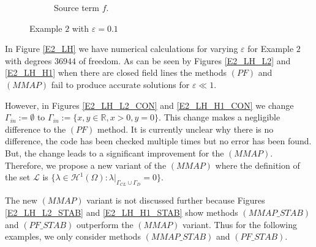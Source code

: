 \documentclass[12pt]{ociamthesis}
\begin{document}
\begin{figure}[H]
\begin{subfigure}{0.5\textwidth}
     \caption{Source term $f$.}
 \end{subfigure}
 \caption{Example $2$ with $\varepsilon = 0.1$} \label{E2_uf}
\end{figure}

In Figure \ref{E2_LH} we have numerical calculations for varying $\varepsilon$ for Example $2$ with degrees $36944$ of freedom. As can be seen by Figures \ref{E2_LH_L2} and \ref{E2_LH_H1} when there are closed field lines the methods $(PF)$ and $(MMAP)$ fail to produce accurate solutions for $\varepsilon \ll 1$.

However, in Figures \ref{E2_LH_L2_CON} and \ref{E2_LH_H1_CON} we change $\Gamma_{in} := \emptyset$ to $\Gamma_{in}:=\{x,y \in \mathbb{R}, x>0, y=0\}$. This change makes a negligible difference to the $(PF)$ method. It is currently unclear why there is no difference, the code has been checked multiple times but no error has been found. But, the change leads to a significant improvement for the $(MMAP)$. Therefore, we propose a new variant of the $(MMAP)$ where the definition of the set $\mathcal{L}$ is $\{\lambda \in \mathcal{H}^1(\Omega): \lambda|_{\Gamma_{CL}\cup \Gamma_{D}}=0\}$.

The new $(MMAP)$ variant is not discussed further because Figures \ref{E2_LH_L2_STAB} and \ref{E2_LH_H1_STAB} show methods $(MMAP\_STAB)$ and $(PF\_STAB)$ outperform the $(MMAP)$ variant. Thus for the following examples, we only consider methods $(MMAP\_STAB)$ and $(PF\_STAB)$.
\end{document}
